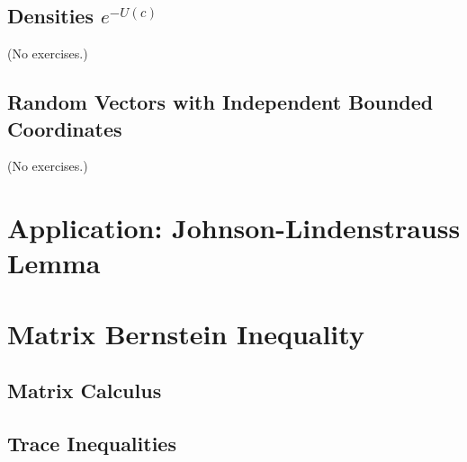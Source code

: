 \documentclass{report}
\theoremstyle{definition}
\newenvironment{exercise}[1]{
  \renewcommand\theexerciseimpl{#1}
  \exerciseimpl
}{\endexerciseimpl}
\begin{document}
\begin{exercise}{5.2.13}
\end{exercise}

\begin{exercise}{5.2.14}
\end{exercise}

\subsection{Densities $e^{-U(c)}$}

(No exercises.)

\subsection{Random Vectors with Independent Bounded Coordinates}

(No exercises.)

\section{Application: Johnson-Lindenstrauss Lemma}

\begin{exercise}{5.3.3}
\end{exercise}

\begin{exercise}{5.3.4}
\end{exercise}

\section{Matrix Bernstein Inequality}

\subsection{Matrix Calculus}

\begin{exercise}{5.4.3}
\end{exercise}

\begin{exercise}{5.4.5}
\end{exercise}

\subsection{Trace Inequalities}

\begin{exercise}{5.4.6}
\end{exercise}
\end{document}
